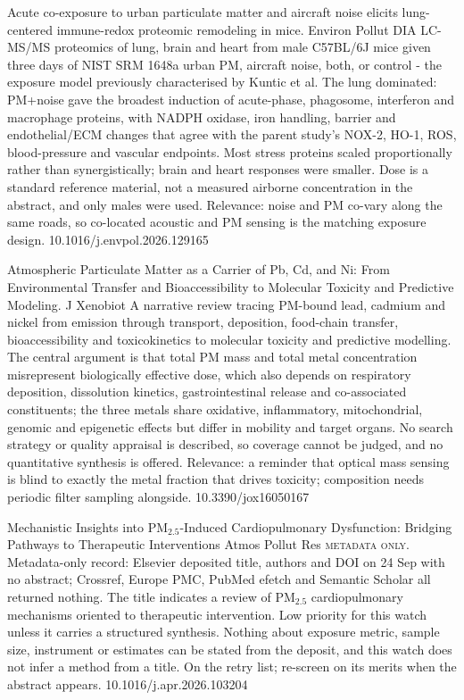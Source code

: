 \documentclass[10pt]{article}
\begin{document}
{Acute co-exposure to urban particulate matter and aircraft noise elicits lung-centered immune-redox proteomic remodeling in mice.}
{Environ Pollut}
{DIA LC-MS/MS proteomics of lung, brain and heart from male C57BL/6J mice given three days of NIST SRM 1648a urban PM, aircraft noise, both, or control - the exposure model previously characterised by Kuntic et al. The lung dominated: PM+noise gave the broadest induction of acute-phase, phagosome, interferon and macrophage proteins, with NADPH oxidase, iron handling, barrier and endothelial/ECM changes that agree with the parent study's NOX-2, HO-1, ROS, blood-pressure and vascular endpoints. Most stress proteins scaled proportionally rather than synergistically; brain and heart responses were smaller. Dose is a standard reference material, not a measured airborne concentration in the abstract, and only males were used. Relevance: noise and PM co-vary along the same roads, so co-located acoustic and PM sensing is the matching exposure design.}
{10.1016/j.envpol.2026.129165}

{Atmospheric Particulate Matter as a Carrier of Pb, Cd, and Ni: From Environmental Transfer and Bioaccessibility to Molecular Toxicity and Predictive Modeling.}
{J Xenobiot}
{A narrative review tracing PM-bound lead, cadmium and nickel from emission through transport, deposition, food-chain transfer, bioaccessibility and toxicokinetics to molecular toxicity and predictive modelling. The central argument is that total PM mass and total metal concentration misrepresent biologically effective dose, which also depends on respiratory deposition, dissolution kinetics, gastrointestinal release and co-associated constituents; the three metals share oxidative, inflammatory, mitochondrial, genomic and epigenetic effects but differ in mobility and target organs. No search strategy or quality appraisal is described, so coverage cannot be judged, and no quantitative synthesis is offered. Relevance: a reminder that optical mass sensing is blind to exactly the metal fraction that drives toxicity; composition needs periodic filter sampling alongside.}
{10.3390/jox16050167}

{Mechanistic Insights into PM$_{2.5}$-Induced Cardiopulmonary Dysfunction: Bridging Pathways to Therapeutic Interventions}
{Atmos Pollut Res}
{\textsc{metadata only.} Metadata-only record: Elsevier deposited title, authors and DOI on 24 Sep with no abstract; Crossref, Europe PMC, PubMed efetch and Semantic Scholar all returned nothing. The title indicates a review of PM$_{2.5}$ cardiopulmonary mechanisms oriented to therapeutic intervention. Low priority for this watch unless it carries a structured synthesis. Nothing about exposure metric, sample size, instrument or estimates can be stated from the deposit, and this watch does not infer a method from a title. On the retry list; re-screen on its merits when the abstract appears.}
{10.1016/j.apr.2026.103204}
\end{document}

